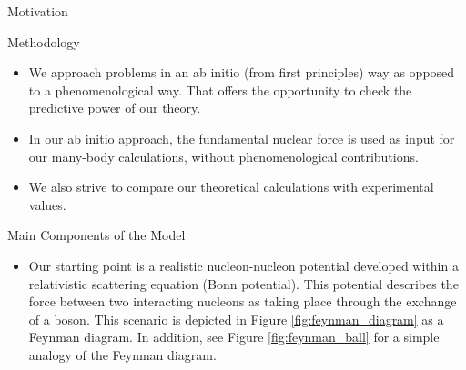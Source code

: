 \documentclass[serif]{beamer}
\begin{document}
\begin{frame}{}
\begin{columns}[t]
\begin{column}{0.32\paperwidth}
\begin{block}{Motivation}
\begin{itemize}
\end{itemize}
\end{block}
\begin{block}{Methodology}
\begin{itemize}
\item \alert{We approach problems in an ab initio (from first principles) way as opposed to a phenomenological way}. That offers the opportunity to check
the predictive power of our theory.
\item In our ab initio approach, the fundamental nuclear force is used as input for our many-body calculations, without phenomenological contributions. 
\item We also strive to compare our theoretical calculations with experimental values.
\end{itemize}
\end{block}
\begin{block}{Main Components of the Model}
\begin{itemize}
\item \alert{Our starting point is a realistic nucleon-nucleon potential developed within a relativistic  scattering equation (Bonn potential)}. This potential describes the force between two interacting nucleons as taking place through the exchange of a boson. This scenario is depicted in Figure \ref{fig:feynman_diagram} as a Feynman diagram. In addition, see Figure \ref{fig:feynman_ball} for a simple analogy of the Feynman diagram.
\begin{figure}[H]
\begin{center}
\hspace{5cm}

\end{center}
\end{figure}
\end{itemize}
\end{block}
\end{column}
\end{columns}
\end{frame}
\end{document}
